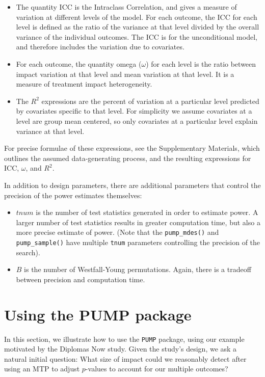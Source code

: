 \documentclass[
]{article}
\providecommand{\tightlist}{%
  \setlength{\itemsep}{0pt}\setlength{\parskip}{0pt}}
\begin{document}
\begin{itemize}
\item
  The quantity \(\text{ICC}\) is the Intraclass Correlation, and gives a
  measure of variation at different levels of the model. For each
  outcome, the ICC for each level is defined as the ratio of the
  variance at that level divided by the overall variance of the
  individual outcomes. The ICC is for the unconditional model, and
  therefore includes the variation due to covariates.
\item
  For each outcome, the quantity omega (\(\omega\)) for each level is
  the ratio between impact variation at that level and mean variation at
  that level. It is a measure of treatment impact heterogeneity.
\item
  The \(R^2\) expressions are the percent of variation at a particular
  level predicted by covariates specific to that level. For simplicity
  we assume covariates at a level are group mean centered, so only
  covariates at a particular level explain variance at that level.
\end{itemize}

For precise formulae of these expressions, see the Supplementary
Materials, which outlines the assumed data-generating process, and the
resulting expressions for \(\text{ICC}\), \(\omega\), and \(R^2\).

In addition to design parameters, there are additional parameters that
control the precision of the power estimates themselves:

\begin{itemize}
\tightlist
\item
  \(tnum\) is the number of test statistics generated in order to
  estimate power. A larger number of test statistics results in greater
  computation time, but also a more precise estimate of power. (Note
  that the \texttt{pump\_mdes()} and \texttt{pump\_sample()} have
  multiple \texttt{tnum} parameters controlling the precision of the
  search).
\item
  \(B\) is the number of Westfall-Young permutations. Again, there is a
  tradeoff between precision and computation time.
\end{itemize}

\section{Using the PUMP package}
\label{sec:vignette}

In this section, we illustrate how to use the \texttt{PUMP} package,
using our example motivated by the Diplomas Now study. Given the study's
design, we ask a natural initial question: What size of impact could we
reasonably detect after using an MTP to adjust \(p\)-values to account
for our multiple outcomes?
\end{document}
